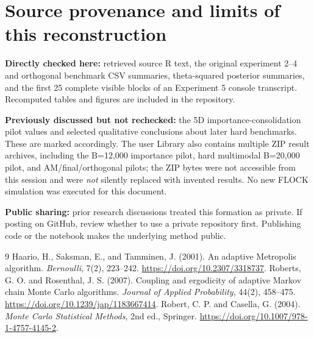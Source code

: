 \documentclass[11pt,letterpaper]{article}
\begin{document}
\section*{Source provenance and limits of this reconstruction}
\textbf{Directly checked here:} retrieved source R text, the original experiment 2--4 and orthogonal benchmark CSV summaries, theta-squared posterior summaries, and the first 25 complete visible blocks of an Experiment 5 console transcript. Recomputed tables and figures are included in the repository.\par
\textbf{Previously discussed but not rechecked:} the 5D importance-consolidation pilot values and selected qualitative conclusions about later hard benchmarks. These are marked accordingly. The user Library also contains multiple ZIP result archives, including the B=12,000 importance pilot, hard multimodal B=20,000 pilot, and AM/final/orthogonal pilots; the ZIP bytes were not accessible from this session and were \emph{not} silently replaced with invented results. No new FLOCK simulation was executed for this document.\par
\textbf{Public sharing:} prior research discussions treated this formation as private. If posting on GitHub, review whether to use a private repository first. Publishing code or the notebook makes the underlying method public.

\begin{thebibliography}{9}
Haario, H., Saksman, E., and Tamminen, J. (2001).
An adaptive Metropolis algorithm. \emph{Bernoulli}, 7(2), 223--242.
\url{https://doi.org/10.2307/3318737}.
Roberts, G. O. and Rosenthal, J. S. (2007).
Coupling and ergodicity of adaptive Markov chain Monte Carlo algorithms.
\emph{Journal of Applied Probability}, 44(2), 458--475.
\url{https://doi.org/10.1239/jap/1183667414}.
Robert, C. P. and Casella, G. (2004).
\emph{Monte Carlo Statistical Methods}, 2nd ed., Springer.
\url{https://doi.org/10.1007/978-1-4757-4145-2}.
\end{thebibliography}
\end{document}
